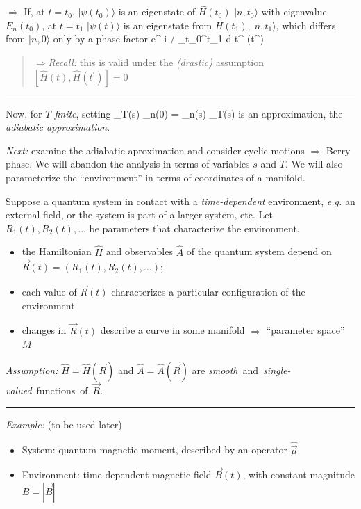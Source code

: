 \documentclass[12pt]{article}
\begin{document}
\ee
$\Rightarrow$ 
If, at $t=t_{0}$, $|\psi(t_{0})\rangle$ is an eigenstate of $\hat{H}(t_{0})$
$|n, t_{0}\rangle$ with eigenvalue $E_{n}(t_{0})$, at $t=t_{1}$ $|\psi(t)\rangle$
is an eigenstate from $H(t_{1}),|n, t_{1}\rangle$, which differs
from $|n, 0\rangle$ only by a phase factor
%
\be
e^{-i / \hbar \int_{t_{0}}^{t_{1}} d t^{\prime} \left(t^{\prime}\right)}
\ee
%
\begin{quote}
$\Rightarrow$\emph{Recall:} this is valid under the 
\emph{(drastic)} assumption
$[\hat{H}(t), \hat{H}(t^{\prime})]=0$
\end{quote}%
\rule{\textwidth}{1pt}

\normalsize
\setcounter{equation}{65}
Now, for \emph{$T$ finite}, setting
\be
{}_T(s) _n(0) = _n(s) _T(s)
\ee
is an approximation, the \emph{adiabatic approximation}.

\emph{Next:} examine the adiabatic aproximation
and consider cyclic motions $\Rightarrow$ Berry phase.
We will abandon the analysis in terms of
variables $s$ and $T$. We will also parameterize
the ``environment'' in terms of coordinates
of a manifold.


Suppose a quantum system in contact with a \emph{time-dependent}
environment, \textit{e.g.} an external field, or the system
is part of a larger system, etc. Let $R_{1}(t), R_{2}(t), \ldots$
be parameters that characterize the environment.
\begin{itemize}
\item the Hamiltonian $\hat{H}$ and observables $\hat{A}$ of the quantum
system depend on $\vec{R}(t)=\left(R_{1}(t), R_{2}(t), \ldots\right)$;
\item each value of $\vec{R}(t)$ characterizes a particular
configuration of the environment
\item changes in $\vec{R}(t)$ describe a curve
in some manifold $\Rightarrow$ ``parameter space'' $M$
\end{itemize}

\emph{Assumption:} $\hat{H}=\hat{H}(\vec{R})$ and $\hat{A}=\hat{A}(\vec{R})$ are \mbox{\emph{smooth} and \emph{single-valued} functions of $\vec{R}$}.


\rule{\textwidth}{1pt}

\small
\emph{Example:} (to be used later)
\begin{itemize}
\item System: quantum magnetic moment,
 described by an operator $\hat{\vec{\mu}}$
\item Environment: time-dependent magnetic field
$\vec{B}(t)$, with constant magnitude $B=|\vec{B}|$
\end{itemize}
\end{document}
